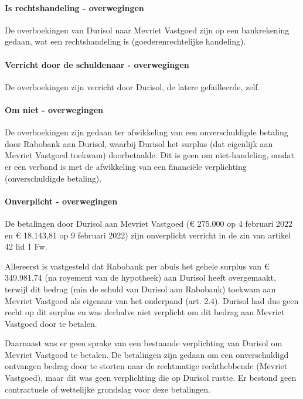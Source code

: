 \documentclass[
  dutch,
  a4paper,
]{article}
\begin{document}
\paragraph{Is rechtshandeling - overwegingen}\label{is-rechtshandeling---overwegingen-15}

De overboekingen van Durisol naar Mevriet Vastgoed zijn op een bankrekening gedaan, wat een rechtshandeling is (goederenrechtelijke handeling).

\paragraph{Verricht door de schuldenaar - overwegingen}\label{verricht-door-de-schuldenaar---overwegingen-15}

De overboekingen zijn verricht door Durisol, de latere gefailleerde, zelf.

\paragraph{Om niet - overwegingen}\label{om-niet---overwegingen-15}

De overboekingen zijn gedaan ter afwikkeling van een onverschuldigde betaling door Rabobank aan Durisol, waarbij Durisol het surplus (dat eigenlijk aan Mevriet Vastgoed toekwam) doorbetaalde. Dit is geen om niet-handeling, omdat er een verband is met de afwikkeling van een financiële verplichting (onverschuldigde betaling).

\paragraph{Onverplicht - overwegingen}\label{onverplicht---overwegingen-15}

De betalingen door Durisol aan Mevriet Vastgoed (€ 275.000 op 4 februari 2022 en € 18.143,81 op 9 februari 2022) zijn onverplicht verricht in de zin van artikel 42 lid 1 Fw.

Allereerst is vastgesteld dat Rabobank per abuis het gehele surplus van € 349.981,74 (na royement van de hypotheek) aan Durisol heeft overgemaakt, terwijl dit bedrag (min de schuld van Durisol aan Rabobank) toekwam aan Mevriet Vastgoed als eigenaar van het onderpand (art. 2.4). Durisol had dus geen recht op dit surplus en was derhalve niet verplicht om dit bedrag aan Mevriet Vastgoed door te betalen.

Daarnaast was er geen sprake van een bestaande verplichting van Durisol om Mevriet Vastgoed te betalen. De betalingen zijn gedaan om een onverschuldigd ontvangen bedrag door te storten naar de rechtmatige rechthebbende (Mevriet Vastgoed), maar dit was geen verplichting die op Durisol rustte. Er bestond geen contractuele of wettelijke grondslag voor deze betalingen.
\end{document}
